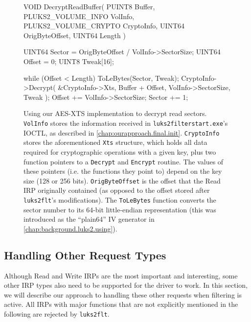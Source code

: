 \begin{figure}
	\begin{ccode}
VOID
DecryptReadBuffer(
    PUINT8 Buffer,
    PLUKS2_VOLUME_INFO VolInfo,
    PLUKS2_VOLUME_CRYPTO CryptoInfo,
    UINT64 OrigByteOffset,
    UINT64 Length
) {
    UINT64 Sector = OrigByteOffset / VolInfo->SectorSize;
    UINT64 Offset = 0;
    UINT8 Tweak[16];

    while (Offset < Length) {
        ToLeBytes(Sector, Tweak);
        CryptoInfo->Decrypt(
            &CryptoInfo->Xts, Buffer + Offset,
            VolInfo->SectorSize, Tweak
        );
        Offset += VolInfo->SectorSize;
        Sector += 1;
    }
}
	\end{ccode}
	\caption[
		Using our AES-XTS implementation to decrypt read sectors
	]{
		Using our AES-XTS implementation to decrypt read sectors. \texttt{VolInfo} stores the information received in \texttt{luks2filterstart.exe}'s IOCTL, as described in \autoref{chap:ourapproach.final.init}. \texttt{CryptoInfo} stores the aforementioned \texttt{Xts} structure, which holds all data required for cryptographic operations with a given key, plus two function pointers to a \texttt{Decrypt} and \texttt{Encrypt} routine. The values of these pointers (i.e. the functions they point to) depend on the key size (128 or 256 bits). \texttt{OrigByteOffset} is the offset that the Read IRP originally contained (as opposed to the offset stored after \texttt{luks2flt}'s modifications). The \texttt{ToLeBytes} function converts the sector number to its 64-bit little-endian representation (this was introduced as the ``plain64'' IV generator in \autoref{chap:background.luks2.using}).
	}
	\label{fig:ourapproach.final.decryptread}
\end{figure}

\subsection{Handling Other Request Types}
\label{chap:ourapproach.final.otherrequests}
Although Read and Write IRPs are the most important and interesting, some other IRP types also need to be supported for the driver to work. In this section, we will describe our approach to handling these other requests when filtering is active. All IRPs with major functions that are not explicitly mentioned in the following are rejected by \texttt{luks2flt}.

